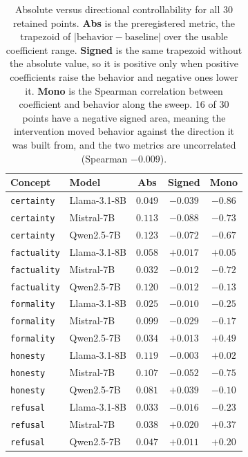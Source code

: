 \begin{table}[htbp]
  \caption{Absolute versus directional controllability for all 30 retained
  points.
  \textbf{Abs} is the preregistered metric, the trapezoid of
  $|\text{behavior} - \text{baseline}|$ over the usable coefficient range.
  \textbf{Signed} is the same trapezoid without the absolute value, so it is
  positive only when positive coefficients raise the behavior and negative ones
  lower it. \textbf{Mono} is the Spearman correlation between coefficient and
  behavior along the sweep. 16 of 30 points have a negative signed area, meaning
  the intervention moved behavior against the direction it was built from, and the
  two metrics are uncorrelated (Spearman $-0.009$).}
  \label{tab:directional}
  \centering
  \footnotesize
  \begin{tabular}{llccc}
    \toprule
    Concept & Model & Abs & Signed & Mono \\
    \midrule
    \texttt{certainty} & Llama-3.1-8B & $0.049$ & $-0.039$ & $-0.86$ \\
    \texttt{certainty} & Mistral-7B & $0.113$ & $-0.088$ & $-0.73$ \\
    \texttt{certainty} & Qwen2.5-7B & $0.123$ & $-0.072$ & $-0.67$ \\
    \texttt{factuality} & Llama-3.1-8B & $0.058$ & $+0.017$ & $+0.05$ \\
    \texttt{factuality} & Mistral-7B & $0.032$ & $-0.012$ & $-0.72$ \\
    \texttt{factuality} & Qwen2.5-7B & $0.120$ & $-0.012$ & $-0.13$ \\
    \texttt{formality} & Llama-3.1-8B & $0.025$ & $-0.010$ & $-0.25$ \\
    \texttt{formality} & Mistral-7B & $0.099$ & $-0.029$ & $-0.17$ \\
    \texttt{formality} & Qwen2.5-7B & $0.034$ & $+0.013$ & $+0.49$ \\
    \texttt{honesty} & Llama-3.1-8B & $0.119$ & $-0.003$ & $+0.02$ \\
    \texttt{honesty} & Mistral-7B & $0.107$ & $-0.052$ & $-0.75$ \\
    \texttt{honesty} & Qwen2.5-7B & $0.081$ & $+0.039$ & $-0.10$ \\
    \texttt{refusal} & Llama-3.1-8B & $0.033$ & $-0.016$ & $-0.23$ \\
    \texttt{refusal} & Mistral-7B & $0.038$ & $+0.020$ & $+0.37$ \\
    \texttt{refusal} & Qwen2.5-7B & $0.047$ & $+0.011$ & $+0.20$ \\

\end{tabular}
\end{table}
